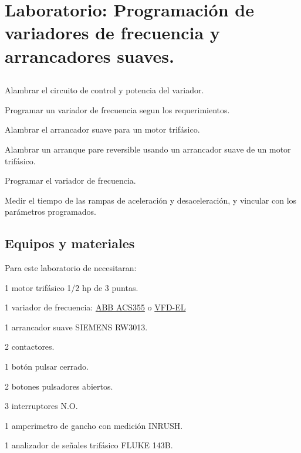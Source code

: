 \chapter{Laboratorio:  Programación de variadores de frecuencia y arrancadores suaves.}

\section{\obj}
\capacidad
\begin{itemize}
	{\small
    \item  Alambrar el circuito de control y potencia del variador.
    \item  Programar un variador de frecuencia segun los requerimientos. 
	\item Alambrar el arrancador suave para un motor trifásico.
	\item Alambrar un arranque pare reversible usando un arrancador suave de un motor trifásico.
	\item Programar el variador de frecuencia.
	\item Medir el tiempo de las rampas de aceleración y desaceleración, y vincular con los parámetros programados.
 }
\end{itemize} 

 
\section{Equipos y materiales}
Para este laboratorio de necesitaran:
\begin{itemize}
	{\small \item 1 motor trifásico 1/2 hp de 3 puntas.
	\item 1 variador de frecuencia: \href{https://search.abb.com/library/Download.aspx?DocumentID=3AUA0000066143&LanguageCode=en&DocumentPartId=1&Action=Launch}{ABB ACS355} o \href{https://vfds.com/content/manuals/delta/delta-vfd-el-manual.pdf}{VFD-EL}
	\item 1 arrancador suave SIEMENS RW3013.
	\item 2 contactores.
	\item 1 botón pulsar cerrado.
	\item 2 botones pulsadores abiertos.
	\item 3 interruptores N.O.
	\item 1 amperimetro de gancho con medición INRUSH.
	\item 1 analizador de señales trifásico FLUKE 143B.
}
\end{itemize}

